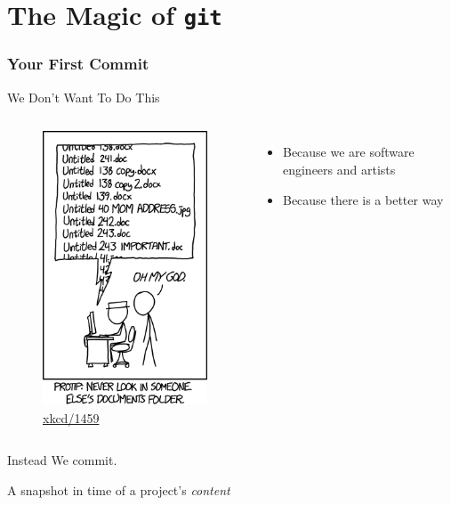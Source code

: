 \documentclass{beamer}
\theoremstyle{example}
\newcommand{\xkcd}[1]{\href{https://xkcd.com/#1}{xkcd/#1}}
\begin{document}
\part{The Magic of \texttt{git}}
\frame{\partpage}
\frame{\tableofcontents[part=2]}

\section{Your First Commit}
\begin{frame}{We Don't Want To Do This}
    \begin{columns}
        \begin{figure}
            \includegraphics[scale=0.4]{img/documents}
            \caption{\xkcd{1459}}
        \end{figure}

        \begin{itemize}
            \item Because we are software engineers and artists
            \item Because there is a better way
        \end{itemize}
    \end{columns}
\end{frame}

\begin{frame}{Instead}
    We commit.

    \begin{definition}[Commit]
        A snapshot in time of a project's \emph{content}
    \end{definition}
\end{frame}
\end{document}
